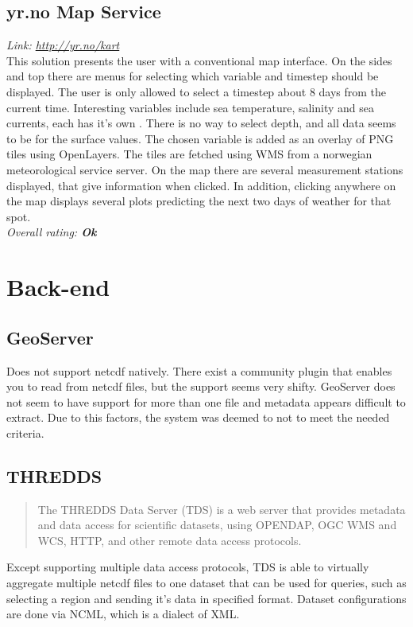 \documentclass[11pt,a4paper,titlepage,oneside]{report}
\begin{document}
  \subsection{yr.no Map Service}
  \emph{Link: \url{http://yr.no/kart}} \\%
This solution presents the user with a conventional map interface. On the sides and top there are menus for selecting which variable and timestep should be displayed. The user is only allowed to select a timestep about 8 days from the current time. Interesting variables include sea temperature, salinity and sea currents, each has it's own . There is no way to select depth, and all data seems to be for the surface values. The chosen variable is added as an overlay of \gls{PNG} tiles using OpenLayers. The tiles are fetched using \gls{WMS} from a norwegian meteorological service server. On the map there are several measurement stations displayed, that give information when clicked. In addition, clicking anywhere on the map displays several plots predicting the next two days of weather for that spot.
  \\ \emph{Overall rating: \textbf{Ok}}

\section{Back-end}

\subsection{GeoServer}
Does not support \gls{netcdf} natively. There exist a community plugin that enables you to read from \gls{netcdf} files, but the support seems very shifty. GeoServer does not seem to have support for more than one file and metadata appears difficult to extract. Due to this factors, the system was deemed to not to meet the needed criteria.

\subsection{THREDDS}
\begin{quote}
The \gls{THREDDS} Data Server (TDS) is a web server that provides metadata and data access for scientific datasets, using \gls{OPENDAP}, \gls{OGC} \gls{WMS} and \gls{WCS}, \gls{HTTP}, and other remote data access protocols. \cite{TDS:Web}
\end{quote}

  Except supporting multiple data access protocols, \gls{TDS} is able to virtually aggregate multiple \gls{netcdf} files to one dataset that can be used for queries, such as selecting a region and sending it's data in specified format. Dataset configurations are done via \gls{NCML}, which is a dialect of \gls{XML}.
\end{document}
